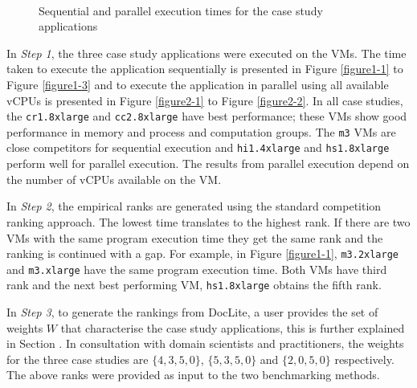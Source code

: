\begin{figure*}[ht]
\centering
	 \hfill
	 \hfill
	\\
	 \hfill
	 \hfill
\caption{Sequential and parallel execution times for the case study applications}
\label{figure11}
\end{figure*}

In \textit{Step 1}, the three case study applications were executed on the VMs. The time taken to execute the application sequentially is presented in Figure \ref{figure1-1} to Figure \ref{figure1-3} and to execute the application in parallel using all available vCPUs is presented in Figure \ref{figure2-1} to Figure \ref{figure2-2}. In all case studies, the \texttt{cr1.8xlarge} and \texttt{cc2.8xlarge} have best performance; these VMs show good performance in memory and process and computation groups. The \texttt{m3} VMs are close competitors for sequential execution and \texttt{hi1.4xlarge} and \texttt{hs1.8xlarge} perform well for parallel execution. 
The results from parallel execution depend on the number of vCPUs available on the VM.

In \textit{Step 2}, the empirical ranks are generated using the standard competition ranking approach. The lowest time translates to the highest rank. If there are two VMs with the same program execution time they get the same rank and the ranking is continued with a gap. For example, in Figure \ref{figure1-1}, \texttt{m3.2xlarge} and \texttt{m3.xlarge} have the same program execution time. Both VMs have third rank and the next best performing VM, \texttt{hs1.8xlarge} obtains the fifth rank. 

In \textit{Step 3}, to generate the rankings from DocLite, a user provides the set of weights $W$ that characterise the case study applications, this is further explained in Section \cite{lightweight}. In consultation with domain scientists and practitioners, the weights for the three case studies are $\{4, 3, 5, 0\}$, $\{5, 3, 5, 0\}$ and $\{2, 0, 5, 0\}$ respectively. The above ranks were provided as input to the two benchmarking methods. 

